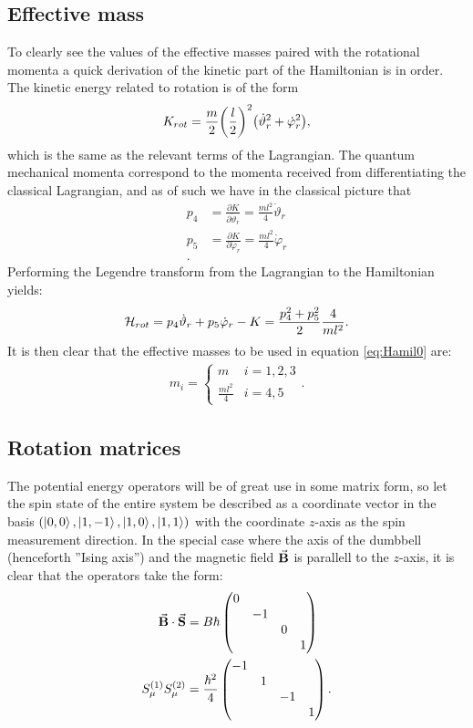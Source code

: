 \documentclass[a4paper]{article}
\begin{document}
\subsection{Effective mass}
To clearly see the values of the effective masses paired with the rotational momenta a quick derivation
of the kinetic part of the Hamiltonian is in order. The kinetic energy related to rotation
is of the form \[
K_{rot}= \frac{m}{2}\pqty{\frac{l}{2}}^2\pqty{\dot \vartheta_r^2 + \dot \varphi_r^2} %
,\] 
which is the same as the relevant terms of the Lagrangian. The quantum mechanical momenta
correspond to the momenta received from differentiating the classical Lagrangian, and as
of %
such we have in the classical picture that 
\begin{align*}
        p_4 &= \frac{\partial K}{\partial \dot \vartheta_r} = \frac{ml^2}{4}\dot \vartheta_r\\
        p_5 &= \frac{\partial K}{\partial \dot \varphi_r} = \frac{ml^2}{4}\dot \varphi_r\\
.\end{align*}
Performing the Legendre transform from the Lagrangian to the Hamiltonian yields:
\begin{align*}
        \mathbb{\cal H}_{rot}= p_4 \dot\vartheta_r + p_5 \dot\varphi_r - K = \frac{
        p_4^2 + p_5^2}{2} \frac{4}{ml^2}
.\end{align*}
It is then clear that the effective masses to be used in equation \ref{eq:Hamil0} are:
\begin{align*}
        m_i = \begin{cases}
                m & i = 1, 2, 3\\
                \frac{ml^2}{4} & i = 4, 5
        \end{cases}
.\end{align*}

\subsection{Rotation matrices}
The potential energy operators will be of great use in some matrix form, so let the spin
state of the entire system be described as a coordinate vector in the basis \((\ket{0, 0}, \ket{1, -1}, \ket{1, 0},
\ket{1, 1})\) with the coordinate \(z\)-axis as the spin measurement direction. In the special case where the axis of the dumbbell (henceforth ''Ising
axis'') and the magnetic field \(\va{B}\) is parallell to the \(z\)-axis, it is clear that the operators take the form:
\begin{align}
        \va{B}\cdot \va{S} &= B\hbar \label{eq:BSmat}
        \begin{pmatrix}
        \dmat{0,-1,0,1}
        \end{pmatrix} \\
        S^{(1)}_{\mu}S^{(2)}_{\mu} &= \frac{\hbar^2}{4} \label{eq:SSmat}
        \begin{pmatrix} 
        \diagonalmatrix{-1,1,-1,1}\end{pmatrix} 
.\end{align}
\end{document}
